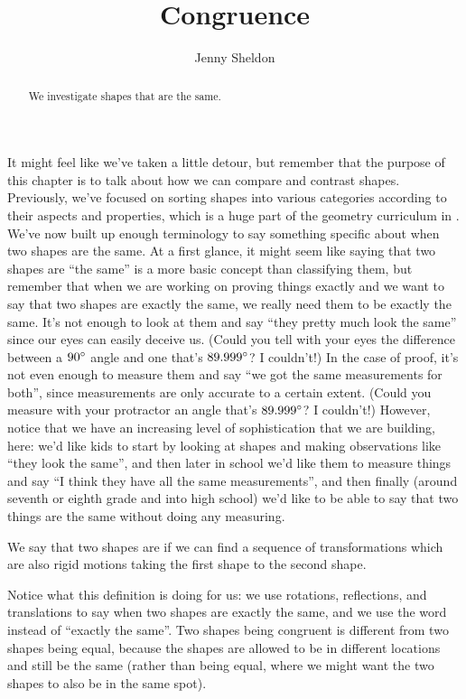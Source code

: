\documentclass{ximera}
\title{Congruence}
\author{Jenny Sheldon}
\begin{document}
\begin{abstract}
We investigate shapes that are the same.
\end{abstract}
\maketitle

It might feel like we've taken a little detour, but remember that the purpose of this chapter is to talk about how we can compare and contrast shapes. Previously, we've focused on sorting shapes into various categories according to their aspects and properties, which is a huge part of the geometry curriculum in .  We've now built up enough terminology to say something specific about when two shapes are the same. At a first glance, it might seem like saying that two shapes are ``the same'' is a more basic concept than classifying them, but remember that when we are working on proving things exactly and we want to say that two shapes are exactly the same, we really need them to be exactly the same. It's not enough to look at them and say ``they pretty much look the same'' since our eyes can easily deceive us. (Could you tell with your eyes the difference between a $90\degree$ angle and one that's $89.999\degree$? I couldn't!) In the case of proof, it's not even enough to measure them and say ``we got the same measurements for both'', since measurements are only accurate to a certain extent. (Could you measure with your protractor an angle that's $89.999\degree$? I couldn't!) However, notice that we have an increasing level of sophistication that we are building, here: we'd like kids to start by looking at shapes and making observations like ``they look the same'', and then later in school we'd like them to measure things and say ``I think they have all the same measurements'', and then finally (around seventh or eighth grade and into high school) we'd like to be able to say that two things are the same without doing any measuring. 

\begin{definition}
We say that two shapes are  if we can find a sequence of transformations which are also rigid motions taking the first shape to the second shape.
\end{definition}
Notice what this definition is doing for us: we use rotations, reflections, and translations to say when two shapes are exactly the same, and we use the word  instead of ``exactly the same''. Two shapes being congruent is different from two shapes being equal, because the shapes are allowed to be in different locations and still be the same (rather than being equal, where we might want the two shapes to also be in the same spot).
\end{document}
